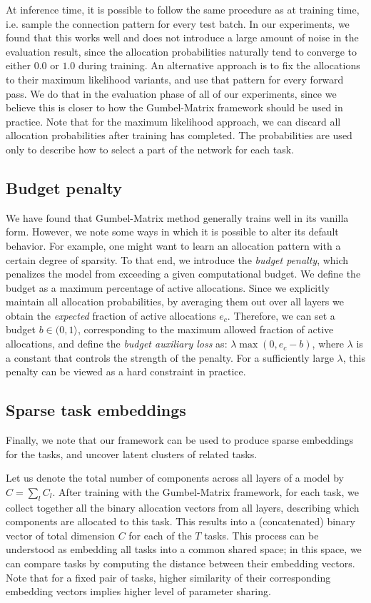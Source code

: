 \documentclass[conference]{IEEEtran}
\begin{document}
At inference time, it is possible to follow the same procedure as at training time, i.e. sample the connection pattern for every test batch. In our experiments, we found that this works well and does not introduce a large amount of noise in the evaluation result, since the allocation probabilities naturally tend to converge to either $0.0$ or $1.0$ during training. An alternative approach is to fix the allocations to their maximum likelihood variants, and use that pattern for every forward pass. We do that in the evaluation phase of all of our experiments, since we believe this is closer to how the Gumbel-Matrix framework should be used in practice. Note that for the maximum likelihood approach, we can discard all allocation probabilities after training has completed. The probabilities are used only to describe how to select a part of the network for each task.

\subsection{Budget penalty}
We have found that Gumbel-Matrix method generally trains well in its vanilla form. However, we note some ways in which it is possible to alter its default behavior. For example, one might want to learn an allocation pattern with a certain degree of sparsity. To that end, we introduce the \textit{budget penalty}, which penalizes the model from exceeding a given computational budget. We define the budget as a maximum percentage of active allocations. Since we explicitly maintain all allocation probabilities, by averaging them out over all layers we obtain the \textit{expected} fraction of active allocations $e_c$. Therefore, we can set a budget $b \in (0, 1\rangle$, corresponding to the maximum allowed fraction of active allocations, and define the \textit{budget auxiliary loss} as: $\lambda \max(0, e_c - b)$, where $\lambda$ is a constant that controls the strength of the penalty. For a sufficiently large $\lambda$, this penalty can be viewed as a hard constraint in practice.

\subsection{Sparse task embeddings}\label{subsec:embeddings}

Finally, we note that our framework can be used to produce sparse embeddings for the tasks, and uncover latent clusters of related tasks.

Let us denote the total number of components across all layers of a model by $C = \sum_l C_l$. After training with the Gumbel-Matrix framework,
for each task, we collect together all the binary allocation vectors from all layers, describing which components are allocated to this task. This results into a (concatenated) binary vector of total dimension $C$ for each of the $T$ tasks. This process can be understood as embedding all tasks into a common shared space; in this space, we can compare tasks by computing the distance between their embedding vectors. Note that for a fixed pair of tasks, higher similarity of their corresponding embedding vectors implies higher level of parameter sharing.
\end{document}
